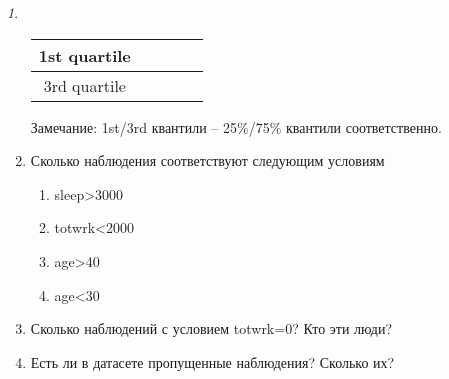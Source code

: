 \documentclass[12pt]{article}
\theoremstyle{remark}
\newtheorem{exercise}{}[section]
\begin{document}
\begin{exercise}
\begin{enumerate}
\begin{center}
\begin{tabular}{|c|c|c|c|c|}
			1st quartile & & & & \\ \hline
			3rd quartile & & & & \\ \hline
		\end{tabular}
	\end{center}
	Замечание: 1st/3rd квантили -- 25\%/75\% квантили соответственно.
	\item Сколько наблюдения соответствуют следующим условиям
	\begin{enumerate}
		\item sleep>3000
		\item totwrk<2000
		\item age>40
		\item age<30
	\end{enumerate}
	\item Сколько наблюдений с условием totwrk=0? 
	Кто эти люди?
	\item Есть ли в датасете пропущенные наблюдения?
	Сколько их?
\end{enumerate}
\end{exercise}
\end{document}
